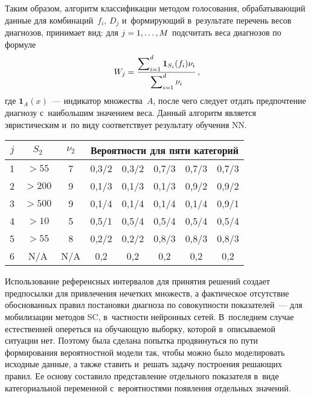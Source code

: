 \begin{multicols}{2}
     
     Таким образом, алгоритм классификации методом голосования, 
обрабатывающий данные для комбинаций~$f_i$, $D_j$ и~фор\-ми\-ру\-ющий 
в~результате перечень весов диагнозов, принимает вид: 
для $j\hm=1,\ldots ,M$  
подсчитать веса диагнозов по формуле
     $$
     W_j= \displaystyle\frac{\displaystyle \sum\nolimits^d_{i=1} \mathbf{1}_{S_i}(f_i) 
\nu_i\mathstrut}{\displaystyle \sum\nolimits^d_{i=1} \nu_i\mathstrut}\,,
     $$
      где $\mathbf{1}_A (x)$~--- индикатор множества~$A$, 
после чего следует отдать предпочтение диагнозу с~наибольшим значением 
веса. Данный алгоритм является эвристическим и~по виду соответствует 
результату обучения NN.

\begin{table*}\small%
\begin{center}
\vspace*{2ex}

\begin{tabular}{|c|c|c|c|c|c|c|c|}
\hline

$j$&$S_2$&$\nu_2$&\multicolumn{5}{c|}{Вероятности для пяти категорий }\\
\hline
1&$>55$&7&0,3/2&0,3/2&0,7/3&0,7/3&0,7/3\\
2&\hphantom{9}$>200$&9&0,1/3&0,1/3&0,1/3&0,9/2&0,9/2\\
3&\hphantom{9}$>500$&9&0,1/4&0,1/4&0,1/4&0,1/4&0,9/1\\
4&$>10$&5&0,5/1&0,5/4&0,5/4&0,5/4&0,5/4\\
5&$>55$&8&0,2/2&0,2/2&0,8/3&0,8/3&0,8/3\\
6&N/A&N/A&0,2&0,2&0,2&0,2&0,2\\
\hline
\end{tabular}
\end{center}
\end{table*}

     Использование референсных интервалов для принятия решений создает 
предпосылки для привлечения нечетких множеств, а фактическое отсутствие 
обоснованных правил постановки диагноза по совокупности показателей~--- 
для мобилизации методов SC, в~частности нейронных сетей. В~последнем 
случае естественней опереться на обучающую выборку, которой в~описываемой 
ситуации нет.
     Поэтому была сделана попытка продвинуться по пути формирования 
вероятностной модели так, чтобы можно было моделировать исходные данные, 
а также ставить и~решать задачу построения решающих правил. Ее основу 
составило представление отдельного показателя в~виде категориальной 
переменной с~вероятностями появления отдельных значений.
     

\end{multicols}
